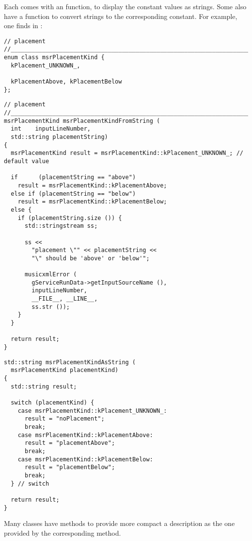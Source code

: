Each \enumType comes with an  function, to display the constant values as strings. Some also have a  function to convert strings to the corresponding constant. For example, one finds in :
\begin{lstlisting}[language=CPlusPlus]
// placement
//______________________________________________________________________________
enum class msrPlacementKind {
  kPlacement_UNKNOWN_,

  kPlacementAbove, kPlacementBelow
};
\end{lstlisting}

\begin{lstlisting}[language=CPlusPlus]
// placement
//______________________________________________________________________________
msrPlacementKind msrPlacementKindFromString (
  int    inputLineNumber,
  std::string placementString)
{
  msrPlacementKind result = msrPlacementKind::kPlacement_UNKNOWN_; // default value

  if      (placementString == "above")
    result = msrPlacementKind::kPlacementAbove;
  else if (placementString == "below")
    result = msrPlacementKind::kPlacementBelow;
  else {
    if (placementString.size ()) {
      std::stringstream ss;

      ss <<
        "placement \"" << placementString <<
        "\" should be 'above' or 'below'";

      musicxmlError (
        gServiceRunData->getInputSourceName (),
        inputLineNumber,
        __FILE__, __LINE__,
        ss.str ());
    }
  }

  return result;
}
\end{lstlisting}

\begin{lstlisting}[language=CPlusPlus]
std::string msrPlacementKindAsString (
  msrPlacementKind placementKind)
{
  std::string result;

  switch (placementKind) {
    case msrPlacementKind::kPlacement_UNKNOWN_:
      result = "noPlacement";
      break;
    case msrPlacementKind::kPlacementAbove:
      result = "placementAbove";
      break;
    case msrPlacementKind::kPlacementBelow:
      result = "placementBelow";
      break;
  } // switch

  return result;
}
\end{lstlisting}

Many classes have  methods to provide more compact a description as the one provided by the corresponding  method.%


